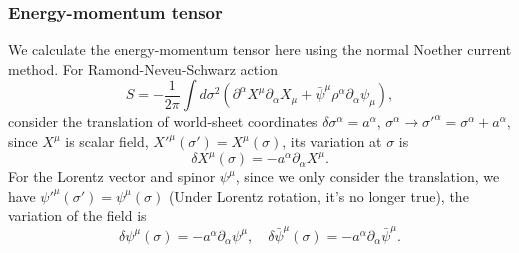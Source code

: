 \documentclass[graybox,envcountchap,sectrefs]{svmono}
\begin{document}
\subsubsection*{Energy-momentum tensor}
We calculate the energy-momentum tensor here using the normal Noether current method. For Ramond-Neveu-Schwarz action
\begin{equation}
S=-\frac{1}{2\pi}\int d\sigma^2 \left(\partial^{\alpha}X^{\mu}\partial_{\alpha}X_{\mu}+\bar{\psi}^{\mu}\rho^{\alpha}\partial_{\alpha}\psi_{\mu}	\right),
\end{equation}
consider the translation of world-sheet coordinates $\delta \sigma^{\alpha}=a^{\alpha}$, $\sigma^{\alpha}\to {\sigma'}^{\alpha}=\sigma^{\alpha} +a^{\alpha}$,
since $X^{\mu}$ is scalar field, ${X'}^{\mu}(\sigma'
)=X^{\mu}(\sigma)$, its variation at $\sigma$ is
\begin{equation}
\delta X^{\mu}(\sigma)=-a^{\alpha}\partial_{\alpha}X^{\mu}.\end{equation}
For the Lorentz vector and spinor $\psi^{\mu}$, since we only consider the translation, we have ${\psi'}^{\mu}(\sigma'
)=\psi^{\mu}(\sigma)$ (Under Lorentz rotation, it's no longer true), the variation of the field is 
\begin{equation}
\delta \psi^{\mu}(\sigma)=-a^{\alpha}\partial_{\alpha}\psi^{\mu},\quad \delta \bar{\psi}^{\mu}(\sigma)=-a^{\alpha}\partial_{\alpha}\bar{\psi}^{\mu}.
\end{equation}
\end{document}
